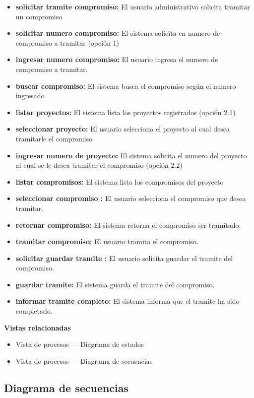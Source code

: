 \documentclass[12pt,oneside,letterpaper]{report}
\begin{document}
\begin{itemize}
 \item \textbf{solicitar tramite compromiso:} El usuario administrativo solicita tramitar un compromiso
 \item \textbf{solicitar numero compromiso:} El sistema solicita en numero de compromiso a tramitar (opción 1)
 \item \textbf{ingresar numero compromiso:} El usuario ingresa el numero de compromiso a tramitar.
 \item \textbf{buscar compromiso:} El sistema busca el compromiso según el numero ingresado
 \item \textbf{listar proyectos:} El sistema lista los proyectos registrados (opción 2.1)
 \item \textbf{seleccionar proyecto:} El usuario selecciona el proyecto al cual desea tramitarle el compromiso
 \item \textbf{ingresar numero de proyecto:} El sistema solicita el numero del proyecto al cual se le desea tramitar el compromiso (opción 2.2)
 \item \textbf{listar compromisos:} El sistema lista los compromisos del proyecto
 \item \textbf{seleccionar compromiso :} El usuario selecciona el compromiso que desea tramitar.
 \item \textbf{retornar compromiso:} El sistema retorna el compromiso  ser tramitado.
 \item \textbf{tramitar compromiso:} El usuario tramita el compromiso.
 \item \textbf{solicitar guardar tramite :} El usuario solicita guardar el tramite del compromiso.
 \item \textbf{guardar tramite:} El sistema guarda el tramite del compromiso.
 \item \textbf{informar tramite completo:} El sistema informa que el tramite ha sido completado.
\end{itemize}


\textbf{Vistas relacionadas}
\begin{itemize}
 \item Vista de procesos --- Diagrama de estados
 \item Vista de procesos --- Diagrama de secuencias
\end{itemize}


\subsection{Diagrama de secuencias}
\end{document}
